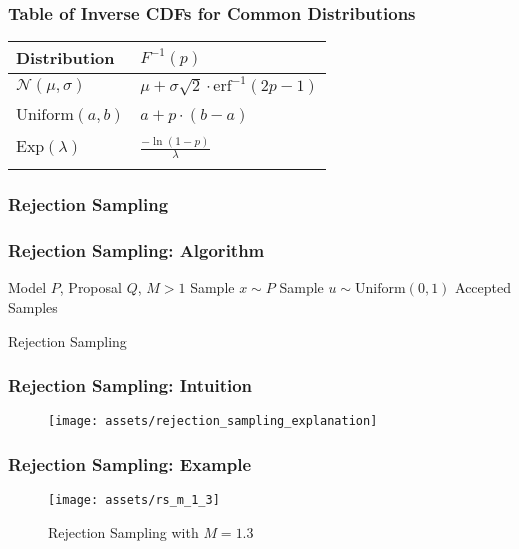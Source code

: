 \documentclass{beamer}
\begin{document}
\begin{frame}
\frametitle{Table of Inverse CDFs for Common Distributions}
\begin{center}
\begin{tabular}{C{5cm}C{5cm}}
\toprule
{Distribution} & $F^{-1}(p)$ \\
\midrule
$\mathcal{N}(\mu, \sigma)$   &  $\mu + \sigma \sqrt{2} \cdot \text{erf}^{-1}\left( 2p - 1 \right)$ \\
\\
$\text{Uniform}(a, b)$   &  $a + p \cdot \left( b - a \right)$ \\
\\
$\text{Exp}(\lambda)$   &  $\frac{- \ln \left( 1 - p \right)}{\lambda}$ \\
\\
\bottomrule
\end{tabular}
\end{center}
\end{frame}




\begin{frame}
\frametitle{Rejection Sampling}
\end{frame}


\begin{frame}
\frametitle{Rejection Sampling: Algorithm}
\begin{algorithm}[H]
\begin{algorithmic}[1]
  \REQUIRE Model $P$, Proposal $Q$, $M > 1$
  \STATE Sample $x \sim P$
  \STATE Sample $u \sim \text{Uniform}(0, 1)$
  \ELSE
  \ENDIF
  \ENSURE Accepted Samples
\end{algorithmic}
\caption{Rejection Sampling}
\end{algorithm}
\end{frame}

\begin{frame}
  \frametitle{Rejection Sampling: Intuition}
  \begin{figure}
    \centering
    \texttt{[image: assets/rejection\_sampling\_explanation]}
  \end{figure}
\end{frame}


\begin{frame}
  \frametitle{Rejection Sampling: Example}
  \begin{figure}
    \centering
    \texttt{[image: assets/rs\_m\_1\_3]}
    \caption{Rejection Sampling with $M = 1.3$}
  \end{figure}
\end{frame}
\end{document}
